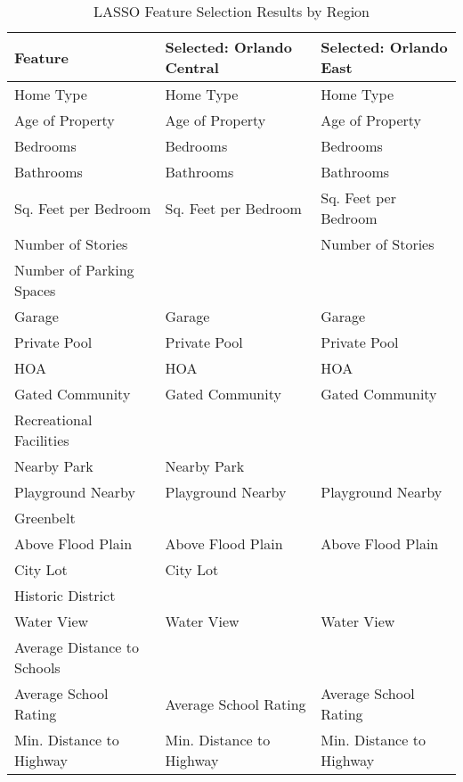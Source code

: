 \begin{table}
\caption{LASSO Feature Selection Results by Region}
\label{tab:lasso_selection_results}
\begin{tabular}{lll}
\toprule
Feature & Selected: Orlando Central & Selected: Orlando East \\
\midrule
Home Type & Home Type & Home Type \\
Age of Property & Age of Property & Age of Property \\
Bedrooms & Bedrooms & Bedrooms \\
Bathrooms & Bathrooms & Bathrooms \\
Sq. Feet per Bedroom & Sq. Feet per Bedroom & Sq. Feet per Bedroom \\
Number of Stories &  & Number of Stories \\
Number of Parking Spaces &  &  \\
Garage & Garage & Garage \\
Private Pool & Private Pool & Private Pool \\
HOA & HOA & HOA \\
Gated Community & Gated Community & Gated Community \\
Recreational Facilities &  &  \\
Nearby Park & Nearby Park &  \\
Playground Nearby & Playground Nearby & Playground Nearby \\
Greenbelt &  &  \\
Above Flood Plain & Above Flood Plain & Above Flood Plain \\
City Lot & City Lot &  \\
Historic District &  &  \\
Water View & Water View & Water View \\
Average Distance to Schools &  &  \\
Average School Rating & Average School Rating & Average School Rating \\
Min. Distance to Highway & Min. Distance to Highway & Min. Distance to Highway \\
\bottomrule
\end{tabular}
\end{table}
